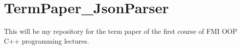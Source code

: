 \chapter{Term\+Paper\+\_\+\+Json\+Parser}
\hypertarget{md__r_e_a_d_m_e}{}\label{md__r_e_a_d_m_e}
\label{md__r_e_a_d_m_e_autotoc_md0}%
%
This will be my repository for the term paper of the first course of FMI OOP C++ programming lectures. 